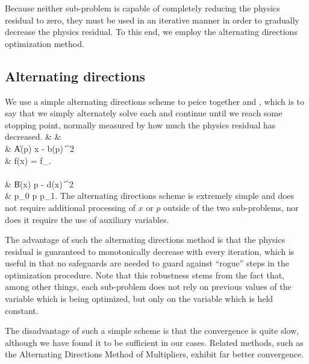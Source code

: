 Because neither sub-problem is capable of completely reducing the physics residual
    to zero, they must be used in an iterative manner in order to
    gradually decrease the physics residual.
To this end, we employ the alternating directions optimization method.

\subsection{Alternating directions}
We use a simple alternating directions scheme 
    to peice together  and ,
    which is to say that we simply
    alternately solve each and continue until we reach some stopping point,
    normally measured by how much the physics residual has decreased.
\BA {} & & \notag \\ 
&  \| A(p) x - b(p) \|^2 \notag \\
 &    \subto f(x) = f_. \notag \\ 
    \\
&  \| B(x) p - d(x) \|^2 \notag \\
    & \subto p_0 \le p \le p_1. \notag \EA
The alternating directions scheme is extremely simple
    and does not require additional processing
    of $x$ or $p$ outside of the two sub-problems,
    nor does it require the use of auxiliary variables.

The advantage of such the alternating directions method
    is that the physics residual is guaranteed to
    monotonically decrease with every iteration,
    which is useful in that no safeguards
    are needed to guard against ``rogue'' steps
    in the optimization procedure.
Note that this robustness stems from the fact that,
    among other things,
    each sub-problem does not rely on previous values of 
    the variable which is being optimized,
    but only on the variable which is held constant.

The disadvantage of such a simple scheme is that 
    the convergence is quite slow,
    although we have found it to be sufficient in our cases.
Related methods, such as the Alternating Directions Method of Multipliers\cite{admm}, 
    exhibit far better convergence.
